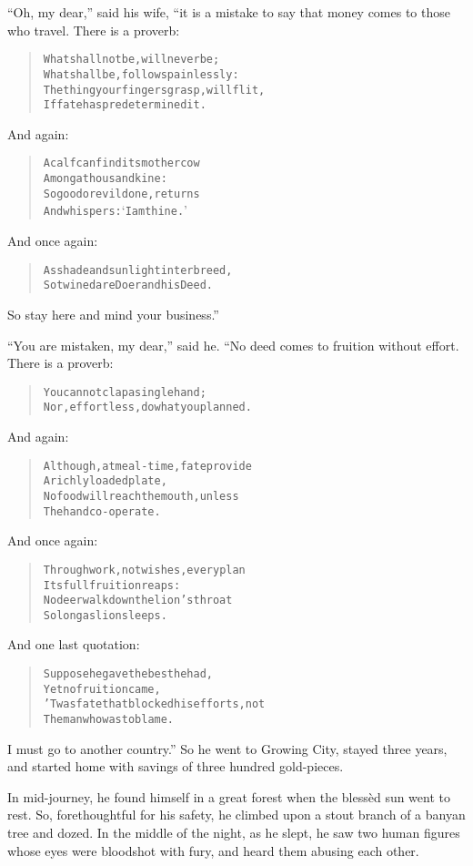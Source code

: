 \documentclass[article, twoside, 14pt]{memoir}
\renewenvironment{verbatim}{%
\begin{quote}%
\vskip -10pt%
\begin{alltt}\normalfont\large}{\end{alltt}%
\end{quote}%
\vskip -10pt
} %
\begin{document}
``Oh, my dear,'' said his wife, “it is a mistake to say that money
comes to those who travel. There is a proverb:

\begin{verbatim}
What shall not be, will never be;
What shall be, follows painlessly:
The thing your fingers grasp, will flit,
If fate has predetermined it.
\end{verbatim}
And again:

\begin{verbatim}
A calf can find its mother cow
    Among a thousand kine:
So good or evil done, returns
    And whispers: ‘I am thine.’
\end{verbatim}
And once again:

\begin{verbatim}
As shade and sunlight interbreed,
So twined are Doer and his Deed.
\end{verbatim}
So stay here and mind your business.”

``You are mistaken, my dear,'' said he. “No deed comes to fruition
without effort. There is a proverb:

\begin{verbatim}
You cannot clap a single hand;
Nor, effortless, do what you planned.
\end{verbatim}
And again:

\begin{verbatim}
Although, at meal-time, fate provide
    A richly loaded plate,
No food will reach the mouth, unless
    The hand co-operate.
\end{verbatim}
And once again:

\begin{verbatim}
Through work, not wishes, every plan
    Its full fruition reaps:
No deer walk down the lion's throat
    So long as lion sleeps.
\end{verbatim}
And one last quotation:

\begin{verbatim}
Suppose he gave the best he had,
    Yet no fruition came,
'Twas fate that blocked his efforts, not
    The man who was to blame.
\end{verbatim}
I must go to another country.” So he went to Growing City, stayed
three years, and started home with savings of three hundred
gold-pieces.

In mid-journey, he found himself in a great forest when the blessèd
sun went to rest. So, forethoughtful for his safety, he climbed
upon a stout branch of a banyan tree and dozed. In the middle of
the night, as he slept, he saw two human figures whose eyes were
bloodshot with fury, and heard them abusing each other.
\end{document}
